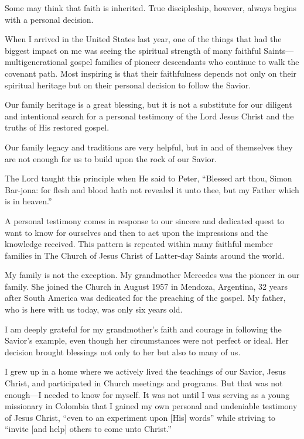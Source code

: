 \documentclass[letterpaper, 11pt]{report}
\begin{document}
Some may think that faith is inherited. True discipleship, however, always begins with a personal decision.

When I arrived in the United States last year, one of the things that had the biggest impact on me was seeing the spiritual strength of many faithful Saints—multigenerational gospel families of pioneer descendants who continue to walk the covenant path. Most inspiring is that their faithfulness depends not only on their spiritual heritage but on their personal decision to follow the Savior.

Our family heritage is a great blessing, but it is not a substitute for our diligent and intentional search for a personal testimony of the Lord Jesus Christ and the truths of His restored gospel.

Our family legacy and traditions are very helpful, but in and of themselves they are not enough for us to build upon the rock of our Savior.

The Lord taught this principle when He said to Peter, “Blessed art thou, Simon Bar-jona: for flesh and blood hath not revealed it unto thee, but my Father which is in heaven.”

A personal testimony comes in response to our sincere and dedicated quest to want to know for ourselves and then to act upon the impressions and the knowledge received. This pattern is repeated within many faithful member families in The Church of Jesus Christ of Latter-day Saints around the world.

My family is not the exception. My grandmother Mercedes was the pioneer in our family. She joined the Church in August 1957 in Mendoza, Argentina, 32 years after South America was dedicated for the preaching of the gospel. My father, who is here with us today, was only six years old.

I am deeply grateful for my grandmother’s faith and courage in following the Savior’s example, even though her circumstances were not perfect or ideal. Her decision brought blessings not only to her but also to many of us.

I grew up in a home where we actively lived the teachings of our Savior, Jesus Christ, and participated in Church meetings and programs. But that was not enough—I needed to know for myself. It was not until I was serving as a young missionary in Colombia that I gained my own personal and undeniable testimony of Jesus Christ, “even to an experiment upon [His] words” while striving to “invite [and help] others to come unto Christ.”
\end{document}
